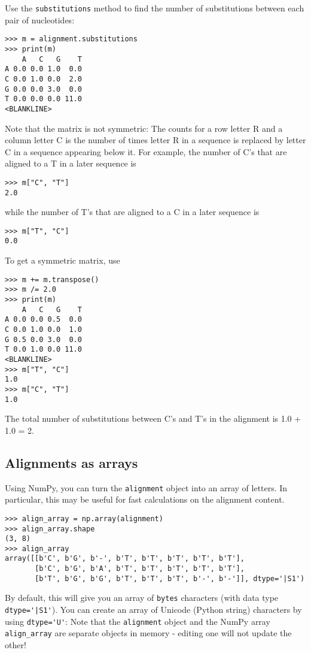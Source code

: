 Use the \verb+substitutions+ method to find the number of substitutions between each pair of nucleotides:
\begin{verbatim}
>>> m = alignment.substitutions
>>> print(m)
    A   C   G    T
A 0.0 0.0 1.0  0.0
C 0.0 1.0 0.0  2.0
G 0.0 0.0 3.0  0.0
T 0.0 0.0 0.0 11.0
<BLANKLINE>
\end{verbatim}

Note that the matrix is not symmetric: The counts for a row letter R and a column letter C is the number of times letter R in a sequence is replaced by letter C in a sequence appearing below it. For example, the number of C's that are aligned to a T in a later sequence is
\begin{verbatim}
>>> m["C", "T"]
2.0
\end{verbatim}
while the number of T's that are aligned to a C in a later sequence is
\begin{verbatim}
>>> m["T", "C"]
0.0
\end{verbatim}
To get a symmetric matrix, use
\begin{verbatim}
>>> m += m.transpose()
>>> m /= 2.0
>>> print(m)
    A   C   G    T
A 0.0 0.0 0.5  0.0
C 0.0 1.0 0.0  1.0
G 0.5 0.0 3.0  0.0
T 0.0 1.0 0.0 11.0
<BLANKLINE>
>>> m["T", "C"]
1.0
>>> m["C", "T"]
1.0
\end{verbatim}
The total number of substitutions between C's and T's in the alignment is 1.0 + 1.0 = 2.

\subsection{Alignments as arrays}

Using NumPy, you can turn the \verb+alignment+ object into an array of letters. In particular, this may be useful for fast calculations on the alignment content.
\begin{verbatim}
>>> align_array = np.array(alignment)
>>> align_array.shape
(3, 8)
>>> align_array
array([[b'C', b'G', b'-', b'T', b'T', b'T', b'T', b'T'],
       [b'C', b'G', b'A', b'T', b'T', b'T', b'T', b'T'],
       [b'T', b'G', b'G', b'T', b'T', b'T', b'-', b'-']], dtype='|S1')
\end{verbatim}
By default, this will give you an array of \verb|bytes| characters (with data type \verb+dtype='|S1'+). You can create an array of Unicode (Python string) characters by using \verb+dtype='U'+:
Note that the \verb+alignment+ object and the NumPy array \verb|align_array| are separate objects in memory - editing one will not update the other!

